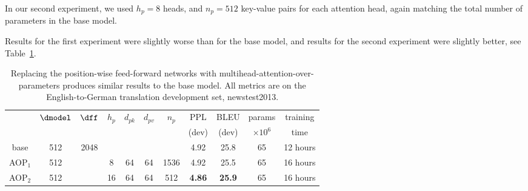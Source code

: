 In our second experiment, we used $h_p=8$ heads, and $n_p=512$ key-value pairs for each attention head, again matching the total number of parameters in the base model.

Results for the first experiment were slightly worse than for the base model, and results for the second experiment were slightly better, see Table~\ref{tab:parameter_attention}.

\begin{table}[h]
\caption{Replacing the position-wise feed-forward networks with multihead-attention-over-parameters produces similar results to the base model.  All metrics are on the English-to-German translation development set, newstest2013.}
\label{tab:parameter_attention}
\begin{center}
\vspace{-2mm}
\begin{tabular}{c|cccccc|cccc}
\hline\rule{0pt}{2.0ex}
 & \multirow{2}{*}{$\dmodel$} & \multirow{2}{*}{$\dff$} &
\multirow{2}{*}{$h_p$} & \multirow{2}{*}{$d_{pk}$} & \multirow{2}{*}{$d_{pv}$} &
 \multirow{2}{*}{$n_p$} &
 PPL & BLEU & params & training\\
 & & & & & &  & (dev) & (dev) & $\times10^6$ & time \\
\hline\rule{0pt}{2.0ex}
base & 512 & 2048 & & & & & 4.92 & 25.8 & 65 & 12 hours\\
\hline\rule{0pt}{2.0ex}
AOP$_1$ & 512 & & 8 & 64 & 64 & 1536 & 4.92& 25.5  & 65 & 16 hours\\
AOP$_2$ & 512 & & 16 & 64 & 64 & 512 & \textbf{4.86} & \textbf{25.9}  & 65 & 16 hours \\
\hline
\end{tabular}
\end{center}
\end{table}
